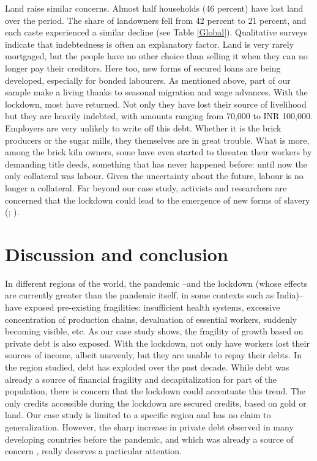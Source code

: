 \documentclass[a4paper, 11pt, onecolumn]{article}
\begin{document}
Land raise similar concerns. 
Almost half households (46 percent) have lost land over the period. 
The share of landowners fell from 42 percent to 21 percent, and each caste experienced a similar decline (see Table \ref{Global}). 
Qualitative surveys indicate that indebtedness is often an explanatory factor. 
Land is very rarely mortgaged, but the people have no other choice than selling it when they can no longer pay their creditors. 
Here too, new forms of secured loans are being developed, especially for bonded labourers. 
As mentioned above, part of our sample make a living thanks to seasonal migration and wage advances. 
With the lockdown, most have returned. 
Not only they have lost their source of livelihood but they are heavily indebted, with amounts ranging from 70,000 to INR 100,000. 
Employers are very unlikely to write off this debt. 
Whether it is the brick producers or the sugar mills, they themselves are in great trouble. What is more, among the brick kiln owners, some have even started to threaten their workers by demanding title deeds, something that has never happened before: until now the only collateral was labour. 
Given the uncertainty about the future, labour is no longer a collateral. 
Far beyond our case study, activists and researchers are concerned that the lockdown could lead to the emergence of new forms of slavery (\citealp{Nagaraj2020}; \citealp[p.14]{Sahas2020}).   

\section*{Discussion and conclusion}
\label{section:conclusion}
In different regions of the world, the pandemic --and the lockdown (whose effects are currently greater than the pandemic itself, in some contexts such as India)-- have exposed pre-existing fragilities: insufficient health systems, excessive concentration of production chains, devaluation of essential workers, suddenly becoming visible, etc. 
As our case study shows, the fragility of growth based on private debt is also exposed. 
With the lockdown, not only have workers lost their sources of income, albeit unevenly, but they are unable to repay their debts. 
In the region studied, debt has exploded over the past decade. 
While debt was already a source of financial fragility and decapitalization for part of the population, there is concern that the lockdown could accentuate this trend. 
The only credits accessible during the lockdown are secured credits, based on gold or land.
Our case study is limited to a specific region and has no claim to generalization. 
However, the sharp increase in private debt observed in many developing countries before the pandemic, and which was already a source of concern \citep{WorldBank2020, UNCTAD2019, UN2020}, really deserves a particular attention.
\end{document}
